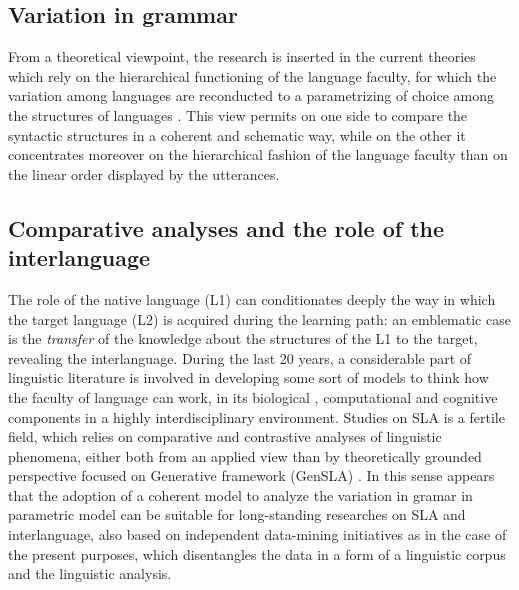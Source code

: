 \documentclass[a4paper,twoside,11pt,chapterprefix=true,listof=totocnumbered,bibliography=totocnumbered]{scrbook}
\theoremstyle{definition}
\theoremstyle{definition}
\theoremstyle{definition}
\theoremstyle{remark}
\begin{document}
\subsection{Variation in grammar}\label{variation-in-grammar}

From a theoretical viewpoint, the research is inserted in the current
theories which rely on the hierarchical functioning of the language
faculty, for which the variation among languages are reconducted to a
parametrizing of choice among the structures of languages
\citep[\citet{chomsky1998}, \citet{chomsky2013}, \citet{chomsky2015},
\citet{adger2011}, \citet{rizzi2013}]{chomsky1995}. This view permits on
one side to compare the syntactic structures in a coherent and schematic
way, while on the other it concentrates moreover on the hierarchical
fashion of the language faculty than on the linear order displayed by
the utterances.

\subsection{Comparative analyses and the role of the
interlanguage}\label{comparative-analyses-and-the-role-of-the-interlanguage}

The role of the native language (L1) can conditionates deeply the way in
which the target language (L2) is acquired during the learning path: an
emblematic case is the \emph{transfer} of the knowledge about the
structures of the L1 to the target, revealing the interlanguage. During
the last 20 years, a considerable part of linguistic literature is
involved in developing some sort of models to think how the faculty of
language can work, in its biological \citep{hcf2002}, computational
\citep{fodor2001} and cognitive components in a highly interdisciplinary
environment. Studies on SLA is a fertile field, which relies on
comparative and contrastive analyses of linguistic phenomena, either
both from an applied view \citep{ellis_study_101} than by theoretically
grounded perspective focused on Generative framework (GenSLA)
\citep[\citet{rothman_slabakova_2017}, \citet{hawkins2001},
\citet{sorace2011pinning}]{guasti2002}. In this sense appears that the
adoption of a coherent model to analyze the variation in gramar in
parametric model can be suitable for long-standing researches on SLA and
interlanguage, also based on independent data-mining initiatives as in
the case of the present purposes, which disentangles the data in a form
of a linguistic corpus and the linguistic analysis.
\end{document}
